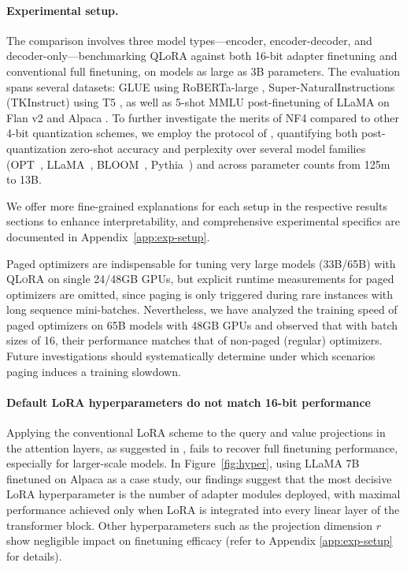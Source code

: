 \paragraph{Experimental setup.} The comparison involves three model types—encoder, encoder-decoder, and decoder-only—benchmarking QLoRA against both 16-bit adapter finetuning and conventional full finetuning, on models as large as 3B parameters. The evaluation spans several datasets: GLUE \citep{wang2018glue} using RoBERTa-large \citep{liu2019roberta}, Super-NaturalInstructions (TKInstruct) \citep{wang2022super} using T5 \citep{t5}, as well as 5-shot MMLU \citep{hendrycksmeasuring} post-finetuning of LLaMA on Flan v2 \citep{longpre2023flan} and Alpaca \citep{alpaca}. To further investigate the merits of NF4 compared to other 4-bit quantization schemes, we employ the protocol of \citet{dettmers2022case}, quantifying both post-quantization zero-shot accuracy and perplexity over several model families (OPT~\citep{zhang2022opt}, LLaMA~\citep{touvron2023llama}, BLOOM~\citep{scao2022bloom}, Pythia~\citep{biderman2023pythia}) and across parameter counts from 125m to 13B.

We offer more fine-grained explanations for each setup in the respective results sections to enhance interpretability, and comprehensive experimental specifics are documented in Appendix~\ref{app:exp-setup}.

Paged optimizers are indispensable for tuning very large models (33B/65B) with \textsc{QLoRA} on single 24/48GB GPUs, but explicit runtime measurements for paged optimizers are omitted, since paging is only triggered during rare instances with long sequence mini-batches. Nevertheless, we have analyzed the training speed of paged optimizers on 65B models with 48GB GPUs and observed that with batch sizes of 16, their performance matches that of non-paged (regular) optimizers. Future investigations should systematically determine under which scenarios paging induces a training slowdown.

\paragraph{Default LoRA hyperparameters do not match 16-bit performance} 

Applying the conventional LoRA scheme to the query and value projections in the attention layers, as suggested in \citep{hu2021lora}, fails to recover full finetuning performance, especially for larger-scale models. In Figure~\ref{fig:hyper}, using LLaMA 7B finetuned on Alpaca as a case study, our findings suggest that the most decisive LoRA hyperparameter is the number of adapter modules deployed, with maximal performance achieved only when LoRA is integrated into every linear layer of the transformer block. Other hyperparameters such as the projection dimension $r$ show negligible impact on finetuning efficacy (refer to Appendix \ref{app:exp-setup} for details).

